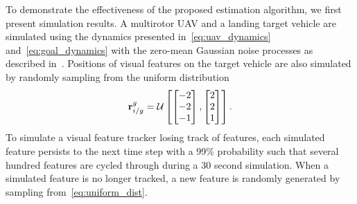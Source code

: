 
To demonstrate the effectiveness of the proposed estimation algorithm, we first
present simulation results.
A multirotor UAV and a landing target vehicle are simulated using the dynamics presented
in~\eqref{eq:uav_dynamics} and~\eqref{eq:goal_dynamics} with the zero-mean
Gaussian noise processes as described
in~.
Positions of visual features on the target vehicle
are also simulated by randomly sampling from the uniform distribution
\begin{equation}
  \boldsymbol{\mathrm{r}}_{i/g}^g = \mathcal{U}
  \left[ \begin{bmatrix} -2 \\ -2 \\ -1 \end{bmatrix},
  \begin{bmatrix} 2 \\ 2 \\ 1 \end{bmatrix} \right].
  \label{eq:uniform_dist}
\end{equation}
To simulate a visual feature tracker losing track of features, each simulated feature
persists to the next time step with a 99\% probability such that several
hundred features are cycled through during a 30 second simulation. When a
simulated feature is no longer tracked, a new feature is randomly generated by
sampling from~\eqref{eq:uniform_dist}.

